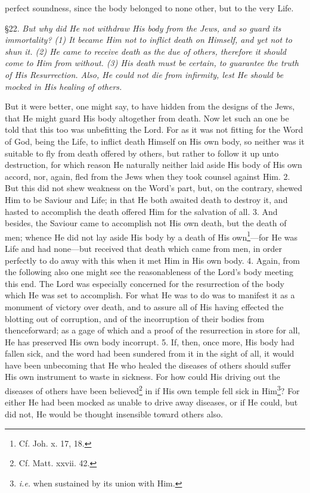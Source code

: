 perfect soundness, since the body belonged to none other, but to the very Life.


§22. \emph{But why did He not withdraw His body from the Jews, and so guard its immortality? (1) It became Him not to inflict death on Himself, and yet not to shun it. (2) He came to receive death as the due of others, therefore it should come to Him from without. (3) His death must be certain, to guarantee the truth of His Resurrection. Also, He could not die from infirmity, lest He should be mocked in His healing of others.}

But it were better, one might say, to have hidden from the designs of the Jews, that He might guard His body altogether from death. Now let such an one be told that this too was unbefitting the Lord. For as it was not fitting for the Word of God, being the Life, to inflict death Himself on His own body, so neither was it suitable to fly from death offered by others, but rather to follow it up unto destruction, for which reason He naturally neither laid aside His body of His own accord, nor, again, fled from the Jews when they took counsel against Him. 2. But this did not shew weakness on the Word’s part, but, on the contrary, shewed Him to be Saviour and Life; in that He both awaited death to destroy it, and hasted to accomplish the death offered Him for the salvation of all. 3. And besides, the Saviour came to accomplish not His own death, but the death of men; whence He did not lay aside His body by a death of His own\footnote{Cf. Joh. x. 17, 18.}—for He was Life and had none—but received that death which came from men, in order perfectly to do away with this when it met Him in His own body. 4. Again, from the following also one might see the reasonableness of the Lord’s body meeting this end. The Lord was especially concerned for the resurrection of the body which He was set to accomplish. For what He was to do was to manifest it as a monument of victory over death, and to assure all of His having effected the blotting out of corruption, and of the incorruption of their bodies from thenceforward; as a gage of which and a proof of the resurrection in store for all, He has preserved His own body incorrupt. 5. If, then, once more, His body had fallen sick, and the word had been sundered from it in the sight of all, it would have been unbecoming that He who healed the diseases of others should suffer His own instrument to waste in sickness. For how could His driving out the diseases of others have been believed\footnote{Cf. Matt. xxvii. 42.} in if His own temple fell sick in Him\footnote{\emph{i.e.} when sustained by its union with Him.}? For either He had been mocked as unable to drive away diseases, or if He could, but did not, He would be thought insensible toward others also.

